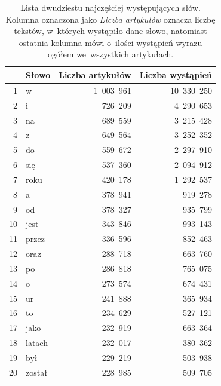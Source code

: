 \documentclass{praca1}
\begin{document}
\begin{table}[ht]
\centering
\begin{tabular}{|r|l|r|r|}
  \hline
 & Słowo & Liczba artykułów & Liczba wystąpień \\ 
  \hline
1 & w~& 1\ 003\ 961 & 10\ 330\ 250 \\ 
  2 & i~& 726\ 209 & 4\ 290\ 653 \\ 
  3 & na~& 689\ 559 & 3\ 215\ 428 \\ 
  4 & z~& 649\ 564 & 3\ 252\ 352 \\ 
  5 & do~& 559\ 672 & 2\ 297\ 910 \\ 
  6 & się & 537\ 360 & 2\ 094\ 912 \\ 
  7 & roku & 420\ 178 & 1\ 292\ 537 \\ 
  8 & a~& 378\ 941 & 919\ 278 \\ 
  9 & od~& 378\ 327 & 935\ 799 \\ 
  10 & jest & 343\ 846 & 993\ 143 \\ 
  11 & przez & 336\ 596 & 852\ 463 \\ 
  12 & oraz & 288\ 718 & 663\ 760 \\ 
  13 & po~& 286\ 818 & 765\ 075 \\ 
  14 & o~& 273\ 574 & 674\ 431 \\ 
  15 & ur~& 241\ 888 & 365\ 934 \\ 
  16 & to~& 234\ 629 & 527\ 121 \\ 
  17 & jako & 232\ 919 & 663\ 364 \\ 
  18 & latach & 232\ 017 & 380\ 362 \\ 
  19 & był & 229\ 219 & 503\ 938 \\ 
  20 & został & 228\ 985 & 509\ 705 \\ 
   \hline
\end{tabular}
\caption{Lista dwudziestu najczęściej występujących słów. Kolumna oznaczona jako \emph{Liczba artykułów} oznacza liczbę tekstów, w~których wystąpiło dane słowo, natomiast ostatnia kolumna mówi o~ilości wystąpień wyrazu ogółem we~wszystkich artykułach.} 
\label{tab:001}
\end{table}
\end{document}
